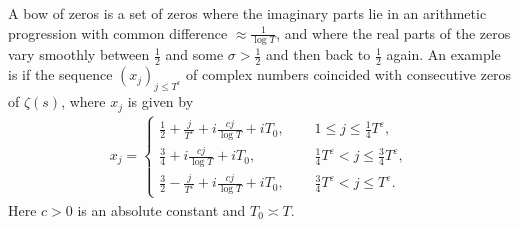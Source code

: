 \documentclass[12pt]{amsart}
\theoremstyle{plain}
\theoremstyle{definition}
\theoremstyle{remark}
\begin{document}
A bow of zeros is a set of zeros where the imaginary parts lie in an arithmetic progression with common difference $\approx \frac{1}{\log T}$, and where the real parts of the zeros vary smoothly between $\frac{1}{2}$ and some $\sigma > \frac{1}{2}$ and then back to $\frac{1}{2}$ again. An example is if the sequence $(x_j)_{j\le T^\epsilon}$ of complex numbers coincided with consecutive zeros of $\zeta(s)$, where $x_j$ is given by
\begin{align}\label{eq:BowOfZeros}
x_j=
\begin{cases}
\frac{1}{2} + \frac{j}{T^\varepsilon} + i\frac{c j}{\log T}+iT_0, \ \ \ \ \ \ &1\leq j\leq  \frac{1}{4}T^\varepsilon, \\
\frac{3}{4} + i\frac{c j }{\log T}+iT_0, &\frac{1}{4} T^\varepsilon < j \leq \frac{3}{4}T^\varepsilon, \\
\frac{3}{2} - \frac{j}{T^\varepsilon} + i\frac{c j}{\log T}+iT_0, &\frac{3}{4}T^\varepsilon < j \leq T^\varepsilon.
\end{cases}
\end{align}
Here $c>0$ is an absolute constant and $T_0 \asymp T$.
\end{document}
